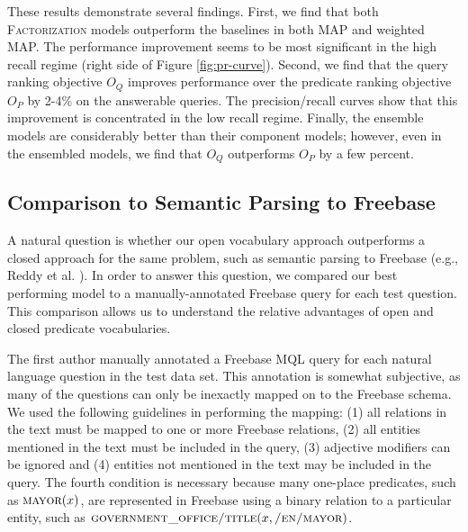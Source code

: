 \documentclass[11pt]{article}
\newcommand{\pred}[1]{\textsc{#1}}
\newcommand{\clb}{\textsc{CorpusLookup}}
\newcommand{\cb}{\textsc{Clustering}}
\begin{document}

These results demonstrate several findings. First, we find that both
\pred{Factorization} models outperform the baselines in both MAP and
weighted MAP. The performance improvement seems to be most significant
in the high recall regime (right side of Figure
\ref{fig:pr-curve}). Second, we find that the query ranking objective
$O_Q$ improves performance over the predicate ranking objective $O_P$
by 2-4\% on the answerable queries. The precision/recall curves show
that this improvement is concentrated in the low recall
regime. Finally, the ensemble models are considerably better than
their component models; however, even in the ensembled models, we find
that $O_Q$ outperforms $O_P$ by a few percent.




\subsection{Comparison to Semantic Parsing to Freebase}
\label{sec:spfb}

A natural question is whether our open vocabulary approach outperforms
a closed approach for the same problem, such as semantic parsing to
Freebase (e.g., Reddy et al. ). In order to
answer this question, we compared our best performing model to a
manually-annotated Freebase query for each test question. This
comparison allows us to understand the relative advantages of open and
closed predicate vocabularies.

The first author manually annotated a Freebase MQL query for each
natural language question in the test data set. This annotation is
somewhat subjective, as many of the questions can only be inexactly
mapped on to the Freebase schema. We used the following guidelines in
performing the mapping: (1) all relations in the text must be mapped
to one or more Freebase relations, (2) all entities mentioned in the
text must be included in the query, (3) adjective modifiers can be
ignored and (4) entities not mentioned in the text may be included in
the query. The fourth condition is necessary because many one-place
predicates, such as $\pred{mayor}(x)$, are represented in Freebase
using a binary relation to a particular entity, such as
$\pred{government\_office/title}(x, \pred{/en/mayor})$.
\end{document}
